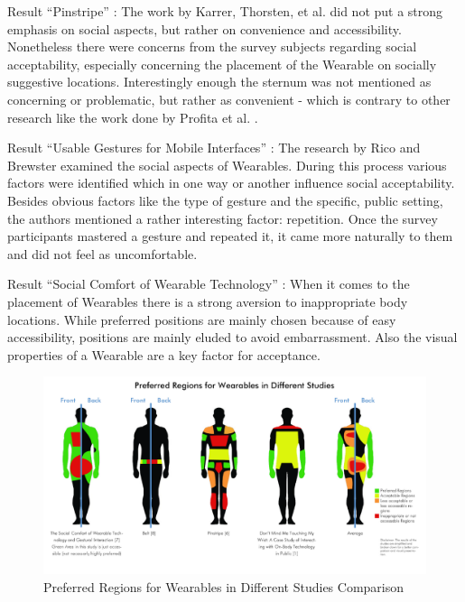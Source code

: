 \documentclass{sigchi}
\begin{document}
Result “Pinstripe” \cite{pinstripe} : The work by Karrer, Thorsten, et al. did not put a strong emphasis on social aspects, but rather on convenience and accessibility. Nonetheless there were concerns from the survey subjects regarding social acceptability, especially concerning the placement of the Wearable on socially suggestive locations. Interestingly enough the sternum was not mentioned as concerning or problematic, but rather as convenient - which is contrary to other research like the work done by Profita et al. \cite{touch-wrist}.

Result “Usable Gestures for Mobile Interfaces” \cite{usable-gesture}: The research by Rico and Brewster examined the social aspects of Wearables. During this process various factors were identified which in one way or another influence social acceptability. Besides obvious factors like the type of gesture and the specific, public setting, the authors mentioned a rather interesting factor: repetition. Once the survey participants mastered a gesture and repeated it, it came more naturally to them and did not feel as uncomfortable.

Result “Social Comfort of Wearable Technology” \cite{social-comfort} : When it comes to the placement of Wearables there is a strong aversion to inappropriate body locations. While preferred positions are mainly chosen because of easy accessibility, positions are mainly eluded to avoid embarrassment. Also the visual properties of a Wearable are a key factor for acceptance.

\begin{figure}[t]
  \includegraphics[width=\textwidth]{body-areas.png}
  \caption{Preferred Regions for Wearables in Different Studies Comparison
  \protect\cite{touch-wrist,pinstripe,social-comfort,belt,simpleskin}}
 \label{fig:body}
\end{figure}
\end{document}
